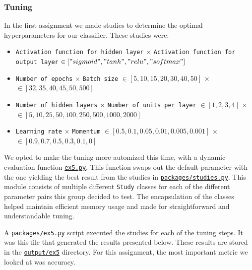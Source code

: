 \subsubsection{Tuning}
\quad In the first assignment we made studies to determine the optimal hyperparameters for our classifier. These studies were:
\begin{itemize}
    \item \texttt{Activation function for hidden layer} $\times$ \texttt{Activation function for output layer}\newline
    $\in["sigmoid", "tanh", "relu", "softmax"]$
    \item \texttt{Number of epochs} $\times$ \texttt{Batch size}\newline
    $\in[5, 10, 15, 20, 30, 40, 50]$
    $\times$
    $\in[32, 35, 40, 45, 50, 500]$
    \item \texttt{Number of hidden layers} $\times$ \texttt{Number of units per layer}\newline
    $\in[1, 2, 3, 4]$
    $\times$
    $\in[5, 10, 25, 50, 100, 250, 500, 1000, 2000]$
    \item \texttt{Learning rate} $\times$ \texttt{Momentum}\newline
    $\in[0.5, 0.1, 0.05, 0.01, 0.005, 0.001]$
    $\times$
    $\in[0.9, 0.7, 0.5, 0.3, 0.1, 0]$
\end{itemize}

We opted to make the tuning more automized this time, with a dynamic evaluation function \href{https://github.uio.no/fabior/IN5550/blob/master/Oblig2/ex5.py}{\texttt{ex5.py}}. This function swaps out the default parameter with the one yielding the best result from the studies in \href{https://github.uio.no/fabior/IN5550/blob/master/Oblig2/packages/studies.py}{\texttt{packages/studies.py}}. This module consists of multiple different \texttt{Study} classes for each of the different parameter pairs this group decided to test. The encapsulation of the classes helped maintain efficient memory usage and made for straightforward and understandable tuning. 

A \href{https://github.uio.no/fabior/IN5550/blob/master/Oblig2/packages/ex5.py}{\texttt{packages/ex5.py}} script executed the studies for each of the tuning steps. It was this file that generated the results presented below. These results are stored in the   \href{https://github.uio.no/fabior/IN5550/blob/master/Oblig2/ex5}{\texttt{output/ex5}} directory. For this assignment, the most important metric we looked at was accuracy.

